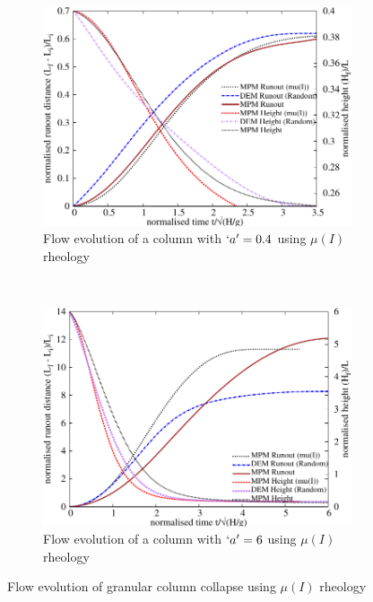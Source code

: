 \begin{figure}[tbhp]
\centering
\begin{subfigure}[b]{0.975\textwidth}
\includegraphics[width=\textwidth]{flowa04muI}
\caption{Flow evolution of a column with $`a'=0.4$ using $\mu(I)$ rheology}
\label{fig:flowa04muI}
\end{subfigure}
\\
\begin{subfigure}[b]{0.975\textwidth}
\centering
\includegraphics[width=\textwidth]{flowa6muI}
\caption{Flow evolution of a column with $`a'=6$ using $\mu(I)$ rheology}
\label{fig:flowa6muI}
\end{subfigure}
\caption{Flow evolution of granular column collapse using $\mu(I)$ rheology}
\label{fig:flow_muI}
\end{figure}

